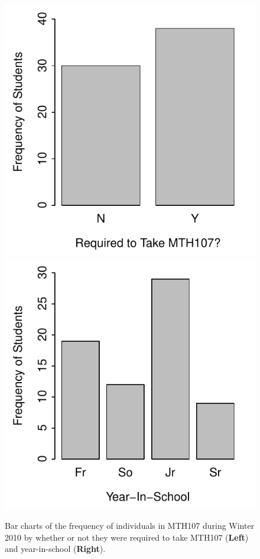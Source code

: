 \documentclass[10pt,openany]{book}\usepackage[]{graphicx}\usepackage[]{color}
\newenvironment{knitrout}{}{} %
\begin{document}
\begin{knitrout}
\color{fgcolor}\begin{figure}[hbtp]

{\centering \includegraphics[width=.4\linewidth]{Figs/MTH107BarChart-1} 
\includegraphics[width=.4\linewidth]{Figs/MTH107BarChart-2} 

}

\caption[Bar charts of the frequency of individuals in MTH107 during Winter 2010 by whether or not they were required to take MTH107 (\textbf{Left}) and year-in-school (\textbf{Right})]{Bar charts of the frequency of individuals in MTH107 during Winter 2010 by whether or not they were required to take MTH107 (\textbf{Left}) and year-in-school (\textbf{Right}).}\label{fig:MTH107BarChart}
\end{figure}


\end{knitrout}


\vspace{-12pt}
\end{document}

